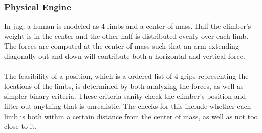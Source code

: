 \documentclass[pdftex,12pt]{article}
\theoremstyle{definition}
\theoremstyle{remark}
\begin{document}
\subsubsection*{Physical Engine}
In jug, a human is modeled as 4 limbs and a center of mass. Half the climber's weight is in the center and the other half is distributed evenly over each limb. The forces are computed at the center of mass such that an arm extending diagonally out and down will contribute both a horizontal and vertical force.\\ \\
The feasibility of a position, which is a ordered list of 4 grips representing the locations of the limbs, is determined by both analyzing the forces, as well as simpler binary criteria. These criteria sanity check the climber's position and filter out anything that is unrealistic. The checks for this include whether each limb is both within a certain distance from the center of mass, as well as not too close to it.
\end{document}
